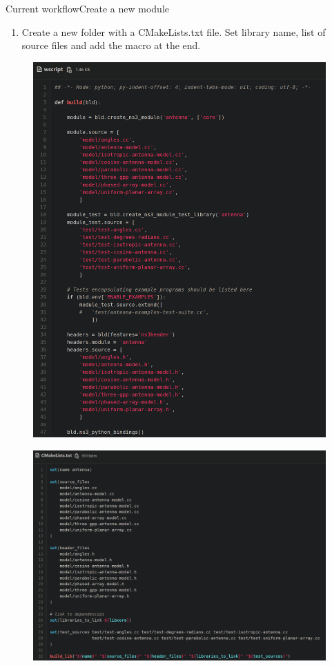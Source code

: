 \documentclass[12pt]{beamer}
\begin{document}
\begin{frame}{Current workflow}{Create a new module}
    \begin{enumerate}
        \item Create a new folder with a CMakeLists.txt file. Set library name, list of source files and add the macro at the end.
    \end{enumerate}
    
    
    \begin{figure}[h]
        \vspace{-1em}
        \hspace{-16em}
        \includegraphics[width=0.45\linewidth]{antena_wscript.PNG} 
    \end{figure}
    
    \begin{figure}[h]
        \vspace{-15em}
        \hspace{+8em}
        \includegraphics[width=0.45\linewidth]{antena_cmake.PNG}
    \end{figure}
\end{frame}
\end{document}
